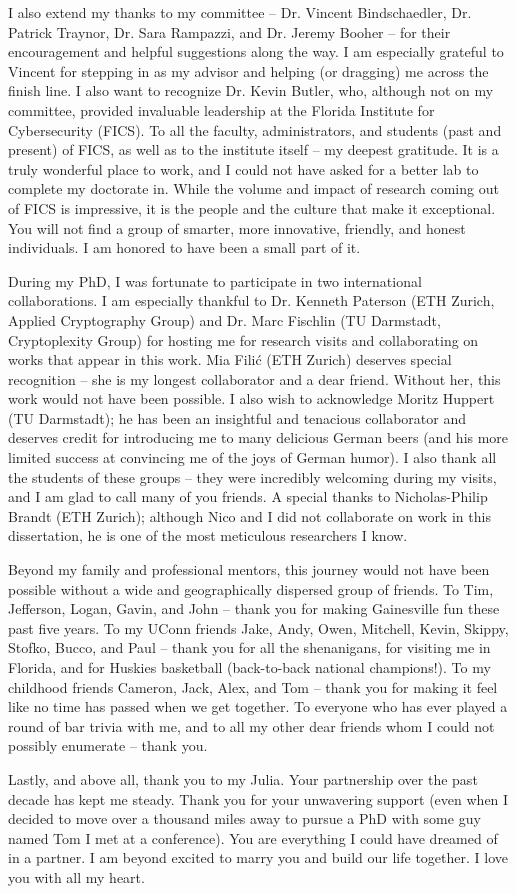 I also extend my thanks to my committee -- Dr. Vincent Bindschaedler, Dr. Patrick Traynor, Dr. Sara Rampazzi, and Dr. Jeremy Booher -- for their encouragement and helpful suggestions along the way. I am especially grateful to Vincent for stepping in as my advisor and helping (or dragging) me across the finish line. I also want to recognize Dr. Kevin Butler, who, although not on my committee, provided invaluable leadership at the Florida Institute for Cybersecurity (FICS). To all the faculty, administrators, and students (past and present) of FICS, as well as to the institute itself -- my deepest gratitude. It is a truly wonderful place to work, and I could not have asked for a better lab to complete my doctorate in. While the volume and impact of research coming out of FICS is impressive, it is the people and the culture that make it exceptional. You will not find a group of smarter, more innovative, friendly, and honest individuals. I am honored to have been a small part of it.

During my PhD, I was fortunate to participate in two international collaborations. I am especially thankful to Dr. Kenneth Paterson (ETH Zurich, Applied Cryptography Group) and Dr. Marc Fischlin (TU Darmstadt, Cryptoplexity Group) for hosting me for research visits and collaborating on works that appear in this work. Mia Filić (ETH Zurich) deserves special recognition -- she is my longest collaborator and a dear friend. Without her, this work would not have been possible. I also wish to acknowledge Moritz Huppert (TU Darmstadt); he has been an insightful and tenacious collaborator and deserves credit for introducing me to many delicious German beers (and his more limited success at convincing me of the joys of German humor). I also thank all the students of these groups -- they were incredibly welcoming during my visits, and I am glad to call many of you friends. A special thanks to Nicholas-Philip Brandt (ETH Zurich); although Nico and I did not collaborate on work in this dissertation, he is one of the most meticulous researchers I know.

Beyond my family and professional mentors, this journey would not have been possible without a wide and geographically dispersed group of friends. To Tim, Jefferson, Logan, Gavin, and John -- thank you for making Gainesville fun these past five years. To my UConn friends Jake, Andy, Owen, Mitchell, Kevin, Skippy, Stofko, Bucco, and Paul -- thank you for all the shenanigans, for visiting me in Florida, and for Huskies basketball (back-to-back national champions!). To my childhood friends Cameron, Jack, Alex, and Tom -- thank you for making it feel like no time has passed when we get together. To everyone who has ever played a round of bar trivia with me, and to all my other dear friends whom I could not possibly enumerate -- thank you.

Lastly, and above all, thank you to my Julia. Your partnership over the past decade has kept me steady. Thank you for your unwavering support (even when I decided to move over a thousand miles away to pursue a PhD with some guy named Tom I met at a conference). You are everything I could have dreamed of in a partner. I am beyond excited to marry you and build our life together. I love you with all my heart.
